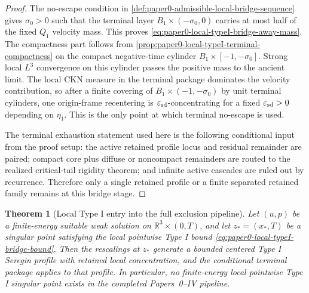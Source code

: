 \documentclass[11pt]{amsart}
\theoremstyle{plain}
\newtheorem{theorem}{Theorem}[section]
\theoremstyle{definition}
\theoremstyle{remark}
\begin{document}
\begin{proof}
The no-escape condition in
\cref{def:paper0-admissible-local-bridge-sequence} gives \(\sigma_0>0\) such
that the terminal layer \(B_1\times(-\sigma_0,0)\) carries at most half of the
fixed \(Q_1\) velocity mass.  This proves
\eqref{eq:paper0-local-typeI-bridge-away-mass}.  The compactness part follows
from \cref{prop:paper0-local-typeI-terminal-compactness} on the compact
negative-time cylinder \(B_1\times[-1,-\sigma_0]\).  Strong local \(L^3\)
convergence on this cylinder passes the positive mass to the ancient limit.
The local CKN measure in the terminal package dominates the velocity
contribution, so after a finite covering of
\(B_1\times(-1,-\sigma_0)\) by unit terminal cylinders, one origin-frame
recentering is \(\varepsilon_{\rm sd}\)-concentrating for a fixed
\(\varepsilon_{\rm sd}>0\) depending on \(\eta_1\).  This is the only point at
which terminal no-escape is used.

The terminal exhaustion statement used here is the following conditional input
from the proof setup: the active retained profile locus and residual remainder
are paired; compact core plus diffuse or noncompact remainders are routed to
the realized critical-tail rigidity theorem; and infinite active cascades are
ruled out by recurrence.  Therefore only a single retained profile or a finite
separated retained family remains at this bridge stage.
\end{proof}

\begin{theorem}[Local Type I entry into the full exclusion pipeline]
\label{thm:paper0-local-typeI-entry-pipeline}
Let \((u,p)\) be a finite-energy suitable weak solution
on \(\mathbb R^3\times(0,T)\), and let \(z_*=(x_*,T)\) be a singular point
satisfying the local pointwise Type I bound
\eqref{eq:paper0-local-typeI-bridge-bound}.  Then the rescalings at \(z_*\)
generate a bounded centered Type I Seregin profile with retained local
concentration, and the conditional terminal package applies to that profile.  In
particular, no finite-energy local pointwise Type I singular point exists in
the completed Papers~0--IV pipeline.
\end{theorem}
\end{document}
